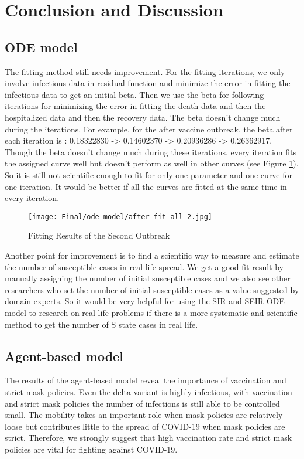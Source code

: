 \section{Conclusion and Discussion}

\subsection{ODE model}
The fitting method still needs improvement. For the fitting iterations, we only involve infectious data in residual function and minimize the error in fitting the infectious data to get an initial beta. Then we use the beta for following iterations for minimizing the error in fitting the death data and then the hospitalized data and then the recovery data. The beta doesn't change much during the iterations. For example, for the after vaccine outbreak, the beta after each iteration is : 0.18322830 -> 0.14602370 ->  0.20936286 -> 0.26362917. Though the beta doesn't change much during these iterations, every iteration fits the assigned curve well but doesn't perform as well in other curves (see Figure \ref{sir5}). So it is still not scientific enough to fit for only one parameter and one curve for one iteration. It would be better if all the curves are fitted at the same time in every iteration.
\begin{figure}
	\centering
	\texttt{[image: Final/ode model/after fit all-2.jpg]}
	\caption{Fitting Results of the Second Outbreak}
	\label{sir5}
\end{figure}

Another point for improvement is to find a scientific way to measure and estimate the number of susceptible cases in real life spread. We get a good fit result by manually assigning the number of initial susceptible cases and we also see other researchers who set the number of initial susceptible cases as a value suggested by domain experts. So it would be very helpful for using the SIR and SEIR ODE model to research on real life problems if there is a more systematic and scientific method to get the number of S state cases in real life.

\subsection{Agent-based model}
The results of the agent-based model reveal the importance of vaccination and strict mask policies. Even the delta variant is highly infectious, with vaccination and strict mask policies the number of infections is still able to be controlled small. The mobility takes an important role when mask policies are relatively loose but contributes little to the spread of COVID-19 when mask policies are strict. Therefore, we strongly suggest that high vaccination rate and strict mask policies are vital for fighting against COVID-19.

